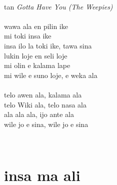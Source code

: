 \documentclass[a4paper]{amsbook}
\begin{document}
\begin{center}
~\\
tan {\itshape Gotta Have You (The Weepies)}\\
~\\
wawa ala en pilin ike\\
mi toki insa ike\\
insa ilo la toki ike, tawa sina\\
lukin loje en seli loje\\
mi olin e kalama lape\\
mi wile e suno loje, e weka ala\\
~\\
telo awen ala, kalama ala\\
telo Wiki ala, telo nasa ala\\
ala ala ala, ijo ante ala\\
wile jo e sina, wile jo e sina\\
\end{center}

~\\

\section{insa ma ali}
\end{document}
